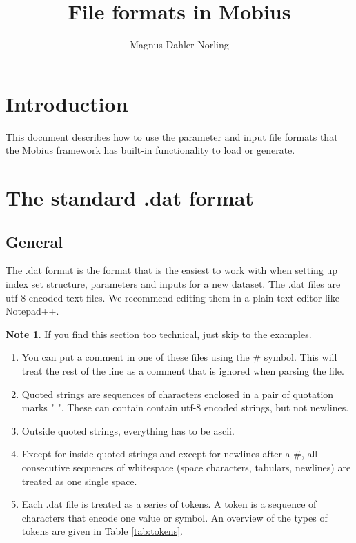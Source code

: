 \documentclass[11pt]{article}
\title{File formats in Mobius}
\author{Magnus Dahler Norling}
\theoremstyle{definition}
\newtheorem{mynote}{Note}
\newenvironment{note}%
  {\begin{lrbox}{\notebox}%
   \begin{minipage}{\dimexpr\linewidth-2\fboxsep}
   \begin{mynote}}%
  {\end{mynote}%
   \end{minipage}%
   \end{lrbox}%
   \begin{trivlist}
     \item[]\colorbox{silver}{\usebox\notebox}
   \end{trivlist}}
\begin{document}
\maketitle

\tableofcontents

\section{Introduction}

This document describes how to use the parameter and input file formats that the Mobius framework has built-in functionality to load or generate.

\section{The standard .dat format}

\subsection{General}
The .dat format is the format that is the easiest to work with when setting up index set structure, parameters and inputs for a new dataset. The .dat files are utf-8 encoded text files. We recommend editing them in a plain text editor like Notepad++.

\begin{note}
If you find this section too technical, just skip to the examples.
\end{note}

\begin{enumerate}[i]
\item You can put a comment in one of these files using the \# symbol. This will treat the rest of the line as a comment that is ignored when parsing the file.
\item Quoted strings are sequences of characters enclosed in a pair of quotation marks " ". These can contain contain utf-8 encoded strings, but not newlines.
\item Outside quoted strings, everything has to be ascii.
\item Except for inside quoted strings and except for newlines after a \#, all consecutive sequences of whitespace (space characters, tabulars, newlines) are treated as one single space.
\item Each .dat file is treated as a series of tokens. A token is a sequence of characters that encode one value or symbol. An overview of the types of tokens are given in Table \ref{tab:tokens}.
\end{enumerate}
\end{document}
